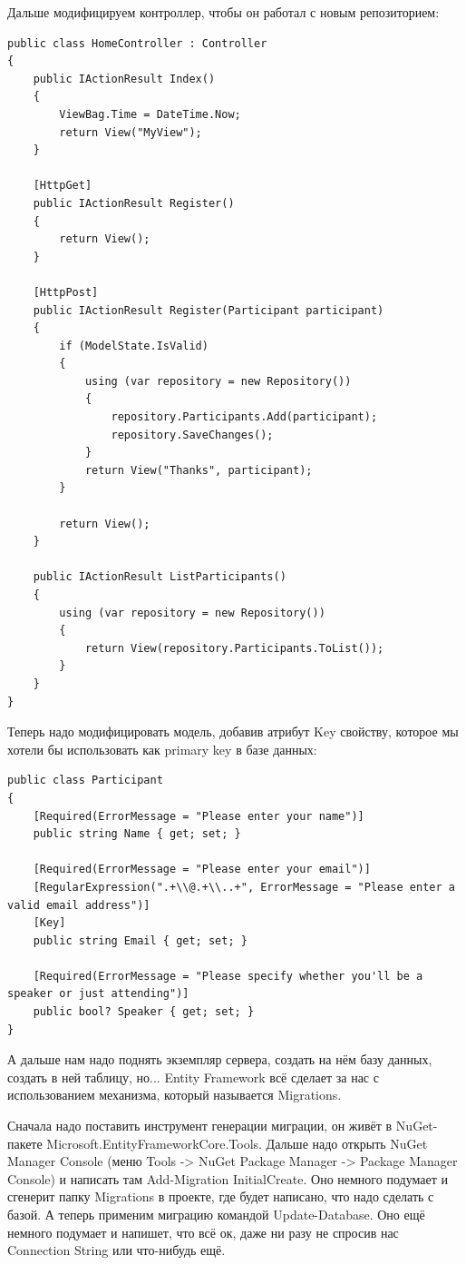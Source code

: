 \documentclass[a5paper]{article}
\begin{document}
Дальше модифицируем контроллер, чтобы он работал с новым репозиторием:

\begin{verbatim}
public class HomeController : Controller
{
    public IActionResult Index()
    {
        ViewBag.Time = DateTime.Now;
        return View("MyView");
    }

    [HttpGet]
    public IActionResult Register()
    {
        return View();
    }

    [HttpPost]
    public IActionResult Register(Participant participant)
    {
        if (ModelState.IsValid)
        {
            using (var repository = new Repository())
            {
                repository.Participants.Add(participant);
                repository.SaveChanges();
            }
            return View("Thanks", participant);
        }

        return View();
    }

    public IActionResult ListParticipants()
    {
        using (var repository = new Repository())
        {
            return View(repository.Participants.ToList());
        }
    }
}
\end{verbatim}

Теперь надо модифицировать модель, добавив атрибут Key свойству, которое мы хотели бы использовать как primary key в базе данных:

\begin{verbatim}
public class Participant
{
    [Required(ErrorMessage = "Please enter your name")]
    public string Name { get; set; }

    [Required(ErrorMessage = "Please enter your email")]
    [RegularExpression(".+\\@.+\\..+", ErrorMessage = "Please enter a valid email address")]
    [Key]
    public string Email { get; set; }

    [Required(ErrorMessage = "Please specify whether you'll be a speaker or just attending")]
    public bool? Speaker { get; set; }
}
\end{verbatim}

А дальше нам надо поднять экземпляр сервера, создать на нём базу данных, создать в ней таблицу, но... Entity Framework всё сделает за нас с использованием механизма, который называется Migrations. 

Сначала надо поставить инструмент генерации миграции, он живёт в NuGet-пакете Microsoft.EntityFrameworkCore.Tools. Дальше надо открыть NuGet Manager Console (меню Tools -> NuGet Package Manager -> Package Manager Console) и
написать там Add-Migration InitialCreate. Оно немного подумает и сгенерит папку Migrations в проекте, где будет написано, что надо сделать с базой. А теперь применим миграцию командой Update-Database. Оно ещё немного подумает и напишет, что всё ок, даже ни разу не спросив нас Connection String 
или что-нибудь ещё.
\end{document}
